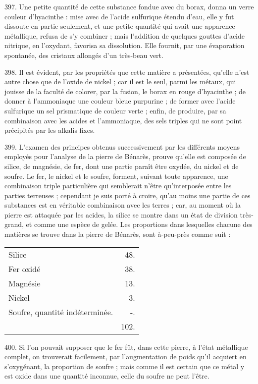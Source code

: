 \documentclass[a4paper, 11pt, oneside, polutonikogreek, french]{article}
\begin{document}
397. Une petite quantité de cette substance fondue avec du borax, donna un verre couleur d'hyacinthe : mise avec de l'acide sulfurique étendu d'eau, elle y fut dissoute en partie seulement, et une petite quantité qui avait une apparence métallique, refusa de s'y combiner ; mais l'addition de quelques gouttes d'acide nitrique, en l'oxydant, favorisa sa dissolution. Elle fournit, par une évaporation spontanée, des cristaux allongés d'un très-beau vert.

398. Il est évident, par les propriétés que cette matière a présentées, qu'elle n'est autre chose que de l'oxide de nickel ; car il est le seul, parmi les métaux, qui jouisse de la faculté de colorer, par la fusion, le borax en rouge d'hyacinthe ; de donner à l'ammoniaque une couleur bleue purpurine ; de former avec l'acide sulfurique un sel prismatique de couleur verte ; enfin, de produire, par sa combinaison avec les acides et l'ammoniaque, des sels triples qui ne sont point précipités par les alkalis fixes.

399. L'examen des principes obtenus successivement par les différents moyens employés pour l'analyse de la pierre de Bénarès, prouve qu'elle est composée de silice, de magnésie, de fer, dont une partie paraît être oxydée, du nickel et de soufre. Le fer, le nickel et le soufre, forment, suivant toute apparence, une combinaison triple particulière qui semblerait n'être qu'interposée entre les parties terreuses ; cependant je suis porté à croire, qu'au moins une partie de ces substances est en véritable combinaison avec les terres ; car, au moment où la pierre est attaquée par les acides, la silice se montre dans un état de division très-grand, et comme une espèce de gelée. Les proportions dans lesquelles chacune des matières se trouve dans la pierre de Bénarès, sont à-peu-près comme suit :

\begin{table}[!ht]
    \centering
    \begin{tabular}{l r}
        Silice & 48. \\
        Fer oxidé & 38. \\
        Magnésie & 13. \\
        Nickel & 3. \\
        Soufre, quantité indéterminée. & -. \\ \hline
        ~ & 102. \\
    \end{tabular}
\end{table}

400. Si l'on pouvait supposer que le fer fût, dans cette pierre, à l'état métallique complet, on trouverait facilement, par l'augmentation de poids qu'il acquiert en s'oxygénant, la proportion de soufre ; mais comme il est certain que ce métal y est oxide dans une quantité inconnue, celle du soufre ne peut l'être.
\end{document}
